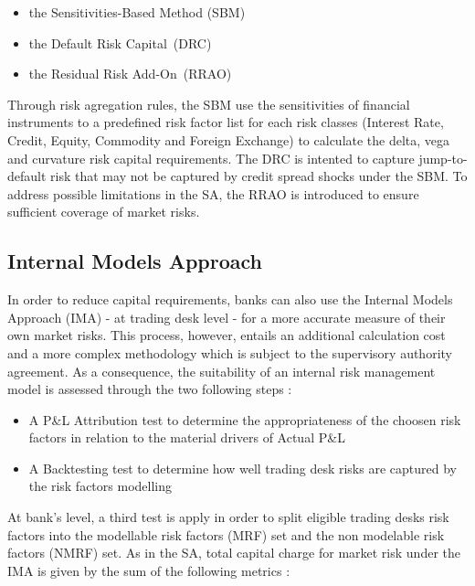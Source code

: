 \documentclass[10pt,a4paper]{report}
\begin{document}
\begin{itemize}
\item the Sensitivities-Based Method (SBM)

\item the Default Risk Capital\ (DRC)

\item the Residual Risk Add-On\ (RRAO)
\end{itemize}

\bigskip

Through risk agregation rules, the SBM use the sensitivities of financial
instruments to a predefined risk factor list for each risk classes (Interest
Rate, Credit, Equity, Commodity and Foreign Exchange) to calculate the
delta, vega and curvature risk capital requirements. The DRC is intented to
capture jump-to-default risk that may not be captured by credit spread
shocks under the SBM. To address possible limitations in the SA, the RRAO is
introduced to ensure sufficient coverage of market risks.

\bigskip 

\subsection{Internal Models Approach}

In order to reduce capital requirements, banks can also use the Internal
Models Approach (IMA) - at trading desk level - for a more accurate measure
of their own market risks. This process, however, entails an additional
calculation cost and a more complex methodology which is subject to the
supervisory authority agreement. As a consequence, the suitability of an internal risk management
model is assessed through the two following steps :

\bigskip 

\begin{itemize}
\item A P\&L Attribution test to determine the appropriateness of the choosen risk factors in relation to the material drivers of
Actual P\&L

\item A Backtesting test to determine how well trading desk  risks  are captured  by the risk factors modelling 
\end{itemize}

\bigskip

At bank's level, a third test is apply in order to split eligible
trading desks risk factors into the modellable risk factors (MRF) set and
the non modelable risk factors (NMRF) set. As in the SA, total capital charge for market risk under the IMA is given by the sum of the following metrics : \\
\end{document}
